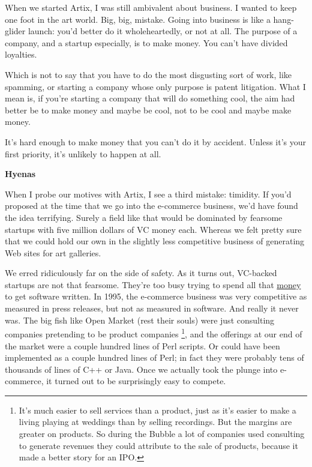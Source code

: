 \documentclass[12pt]{book}
\begin{document}
When we started Artix, I was still ambivalent about business. I wanted
to keep one foot in the art world. Big, big, mistake. Going into
business is like a hang-glider launch: you'd better do it
wholeheartedly, or not at all. The purpose of a company, and a startup
especially, is to make money. You can't have divided loyalties.

Which is not to say that you have to do the most disgusting sort of
work, like spamming, or starting a company whose only purpose is patent
litigation. What I mean is, if you're starting a company that will do
something cool, the aim had better be to make money and maybe be cool,
not to be cool and maybe make money.

It's hard enough to make money that you can't do it by accident. Unless
it's your first priority, it's unlikely to happen at all.

\textbf{Hyenas}

When I probe our motives with Artix, I see a third mistake: timidity. If
you'd proposed at the time that we go into the e-commerce business, we'd
have found the idea terrifying. Surely a field like that would be
dominated by fearsome startups with five million dollars of VC money
each. Whereas we felt pretty sure that we could hold our own in the
slightly less competitive business of generating Web sites for art
galleries.

We erred ridiculously far on the side of safety. As it turns out,
VC-backed startups are not that fearsome. They're too busy trying to
spend all that \href{venturecapital.html}{money} to get software
written. In 1995, the e-commerce business was very competitive as
measured in press releases, but not as measured in software. And really
it never was. The big fish like Open Market (rest their souls) were just
consulting companies pretending to be product companies
\footnote{It's much easier to sell services than a product, just as it's
easier to make a living playing at weddings than by selling recordings.
But the margins are greater on products. So during the Bubble a lot of
companies used consulting to generate revenues they could attribute to
the sale of products, because it made a better story for an IPO.}, and the offerings at our end of the market were
a couple hundred lines of Perl scripts. Or could have been implemented
as a couple hundred lines of Perl; in fact they were probably tens of
thousands of lines of C++ or Java. Once we actually took the plunge into
e-commerce, it turned out to be surprisingly easy to compete.
\end{document}

